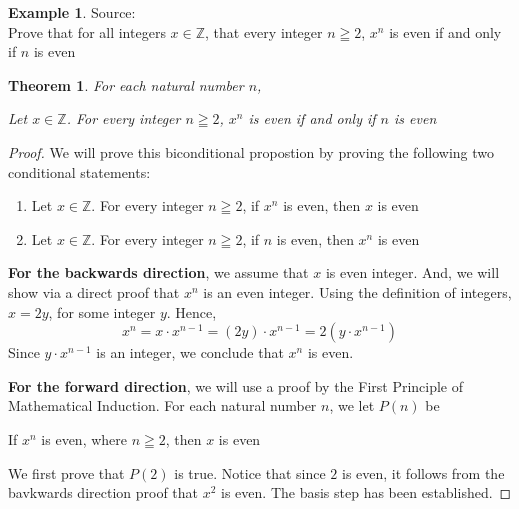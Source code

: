 \documentclass{book}
\newtheorem{theorem}{Theorem}[section]
\theoremstyle{definition}
\newtheorem{example}{Example}[definition]
\theoremstyle{remark}
\newcommand{\bb}[1]{\mathbb{#1}}
\newcommand{\m}{\cdot}
\begin{document}
\newpage
\begin{example}
\label{sdf1}
Source: \cite[Chap.6, S.6.2, Result 6.13]{gray} \\ 


Prove that for all integers $x \in \bb{Z}$, that every integer $n \geqq 2$, $x^n$ is even if and only if $n$ is even
    \begin{tcolorbox}
        \begin{theorem}
            For each natural number $n$,
                \begin{center}
                    Let $x \in \bb{Z}$. For every integer $n \geqq 2$, $x^n$ is even if and only if $n$ is even
                \end{center}
        \end{theorem}
    \end{tcolorbox}

    \begin{proof}
        We will prove this biconditional propostion by proving the following two conditional statements: \\
            \begin{enumerate}
                \item Let $x \in \bb{Z}$. For every integer $n \geqq 2$, if $x^n$ is even, then $x$ is even
                \item Let $x \in \bb{Z}$. For every integer $n \geqq 2$, if $n$ is even, then $x^n$ is even
            \end{enumerate}
        
        \textbf{For the backwards direction}, we assume that $x$ is even integer. And, we will show via a direct proof that $x^n$ is an even integer. Using the definition of integers, $x = 2y$, for some integer $y$. Hence, 
                \begin{equation*}
                    x^n = x \m x^{n-1} = (2y) \m x^{n-1} = 2(y \m x^{n-1})
                \end{equation*}
            Since $y \m x ^{n-1}$ is an integer, we conclude that $x^n$ is even.
    
        \textbf{For the forward direction}, we will use a proof by the First Principle of Mathematical Induction. For each natural number $n$, we let $P(n)$ be
                \begin{center}
                    If $x^n$ is even, where $n \geqq 2$, then $x$ is even
                \end{center}
            We first prove that $P(2)$ is true. Notice that since $2$ is even, it follows from the bavkwards direction proof that $x^2$ is even. The basis step has been established.   
            

\end{proof}
\end{example}
\end{document}
